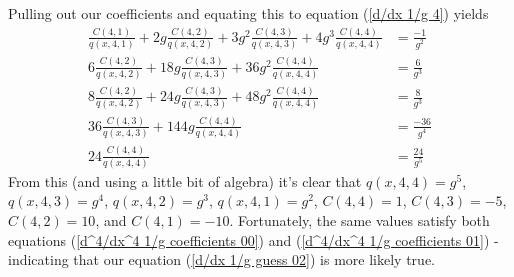 Pulling out our coefficients and equating this to equation (\ref{d/dx 1/g 4}) yields
\begin{align}
	\frac{C(4,1)}{q(x, 4, 1)}+2g\frac{C(4,2)}{q(x, 4, 2)}+3g^2\frac{C(4,3)}{q(x, 4, 3)}+4 g^3 \frac{C(4,4)}{q(x, 4, 4)} &= \frac{-1}{g^2} \\
	6\frac{C(4,2)}{q(x, 4, 2)}+18g\frac{C(4,3)}{q(x, 4, 3)}+36 g^2\frac{C(4,4)}{q(x, 4, 4)} &= \frac{6}{g^3} \label{d^4/dx^4 1/g coefficients 00}\\
	8\frac{C(4,2)}{q(x, 4, 2)} + 24g\frac{C(4,3)}{q(x, 4, 3)}+48 g^2 \frac{C(4,4)}{q(x, 4, 4)} &= \frac{8}{g^3} \label{d^4/dx^4 1/g coefficients 01}\\
	36\frac{C(4,3)}{q(x, 4, 3)} + 144 g \frac{C(4,4)}{q(x, 4, 4)} &= \frac{-36}{g^4} \\
	24\frac{C(4,4)}{q(x, 4, 4)} &= \frac{24}{g^5}
\end{align}
From this (and using a little bit of algebra) it's clear that $q(x,4,4)=g^5$, $q(x,4,3)=g^4$, $q(x,4,2) = g^3$, $q(x,4,1) = g^2$, $C(4,4)=1$, $C(4,3) = -5$, $C(4,2)=10$, and $C(4,1)=-10$. Fortunately, the same values satisfy both equations (\ref{d^4/dx^4 1/g coefficients 00}) and (\ref{d^4/dx^4 1/g coefficients 01}) - indicating that our equation (\ref{d/dx 1/g guess 02}) is more likely true.

